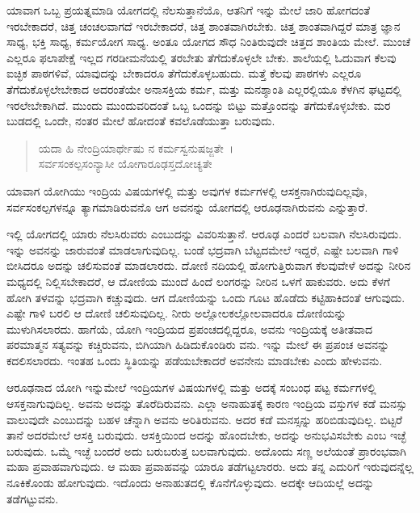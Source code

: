 ಯಾವಾಗ ಒಬ್ಬ ಪ್ರಯತ್ನಮಾಡಿ ಯೋಗದಲ್ಲಿ ನೆಲಸುತ್ತಾನೆಯೊ, ಆತನಿಗೆ ಇನ್ನು ಮೇಲೆ ಜಾರಿ ಹೋಗದಂತೆ ಇರಬೇಕಾದರೆ, ಚಿತ್ತ ಚಂಚಲವಾಗದೆ ಇರಬೇಕಾದರೆ, ಚಿತ್ತ ಶಾಂತವಾಗಿರಬೇಕು. ಚಿತ್ತ ಶಾಂತವಾಗಿದ್ದರೆ ಮಾತ್ರ ಜ್ಞಾನ ಸಾಧ್ಯ, ಭಕ್ತಿ ಸಾಧ್ಯ, ಕರ್ಮಯೋಗ ಸಾಧ್ಯ. ಅಂತೂ ಯೋಗದ ಸೌಧ ನಿಂತಿರುವುದೇ ಚಿತ್ತದ ಶಾಂತಿಯ ಮೇಲೆ. ಮುಂಚೆ ಎಲ್ಲರೂ ಫಲಾಪೇಕ್ಷೆ ಇಲ್ಲದ ಗರಡೀಮನೆಯಲ್ಲಿ ತರಬೇತು ತೆಗೆದುಕೊಳ್ಳಲೇ ಬೇಕು. ಶಾಲೆಯಲ್ಲಿ ಓದುವಾಗ ಕೆಲವು ಐಚ್ಛಿಕ ಪಾಠಗಳಿವೆ, ಯಾವುದನ್ನು ಬೇಕಾದರೂ ತೆಗೆದುಕೊಳ್ಳಬಹುದು. ಮತ್ತೆ ಕೆಲವು ಪಾಠಗಳು ಎಲ್ಲರೂ ತೆಗೆದುಕೊಳ್ಳಲೇಬೇಕಾದ ಅದರಂತೆಯೇ ಅನಾಸಕ್ತಿಯ ಕರ್ಮ, ಮತ್ತು ಮನಶ್ಶಾಂತಿ ಎಲ್ಲರಲ್ಲಿಯೂ ಕೆಳಗಿನ ಘಟ್ಟದಲ್ಲಿ ಇರಲೇಬೇಕಾಗಿದೆ. ಮುಂದು ಮುಂದುವರಿದಂತೆ ಒಬ್ಬ ಒಂದನ್ನು ಬಿಟ್ಟು ಮತ್ತೊಂದನ್ನು ತಗೆದುಕೊಳ್ಳಬೇಕು. ಮರ ಬುಡದಲ್ಲಿ ಒಂದೇ, ನಂತರ ಮೇಲೆ ಹೋದಂತೆ ಕವಲೊಡೆಯುತ್ತಾ ಬರುವುದು.

\begin{verse}
ಯದಾ ಹಿ ನೇಂದ್ರಿಯಾರ್ಥೇಷು ನ ಕರ್ಮಸ್ವನುಷಜ್ಜತೇ~।\\ಸರ್ವಸಂಕಲ್ಪಸಂನ್ಯಾಸೀ ಯೋಗಾರೂಢಸ್ತದೋಚ್ಯತೇ 
\end{verse}

{\small ಯಾವಾಗ ಯೋಗಿಯು ಇಂದ್ರಿಯ ವಿಷಯಗಳಲ್ಲಿ ಮತ್ತು ಅವುಗಳ ಕರ್ಮಗಳಲ್ಲಿ ಆಸಕ್ತನಾಗಿರುವುದಿಲ್ಲವೊ, ಸರ್ವಸಂಕಲ್ಪಗಳನ್ನೂ ತ್ಯಾಗಮಾಡಿರುವನೊ ಆಗ ಅವನನ್ನು ಯೋಗದಲ್ಲಿ ಆರೂಢನಾಗಿರುವನು ಎನ್ನುತ್ತಾರೆ.}

ಇಲ್ಲಿ ಯೋಗದಲ್ಲಿ ಯಾರು ನೆಲಸಿರುವರು ಎಂಬುದನ್ನು ವಿವರಿಸುತ್ತಾನೆ. ಆರೂಢ ಎಂದರೆ ಬಲವಾಗಿ ನೆಲಸಿರುವುದು. ಇನ್ನು ಅವನನ್ನು ಜಾರುವಂತೆ ಮಾಡಲಾಗುವುದಿಲ್ಲ. ಬಂಡೆ ಭದ್ರವಾಗಿ ಬೆಟ್ಟದಮೇಲೆ ಇದ್ದರೆ, ಎಷ್ಟೇ ಬಲವಾಗಿ ಗಾಳಿ ಬೀಸಿದರೂ ಅದನ್ನು ಚಲಿಸುವಂತೆ ಮಾಡಲಾರದು. ದೋಣಿ ನದಿಯಲ್ಲಿ ಹೋಗುತ್ತಿರುವಾಗ ಕೆಲವುವೇಳೆ ಅದನ್ನು ನೀರಿನ ಮಧ್ಯದಲ್ಲಿ ನಿಲ್ಲಿಸಬೇಕಾದರೆ, ಆ ದೋಣಿಯ ಮುಂದೆ ಹಿಂದೆ ಲಂಗರನ್ನು ನೀರಿನ ಒಳಗೆ ಹಾಕುವರು. ಅದು ಕೆಳಗೆ ಹೋಗಿ ತಳವನ್ನು ಭದ್ರವಾಗಿ ಕಚ್ಚುವುದು. ಆಗ ದೋಣಿಯನ್ನು ಒಂದು ಗೂಟ ಹೊಡೆದು ಕಟ್ಟಿಹಾಕಿದಂತೆ ಆಗುವುದು. ಎಷ್ಟೇ ಗಾಳಿ ಬರಲಿ ಆ ದೋಣಿ ಚಲಿಸುವುದಿಲ್ಲ. ನೀರು ಅಲ್ಲೋಲಕಲ್ಲೋಲವಾದರೂ ದೋಣಿಯನ್ನು ಮುಳುಗಿಸಲಾರದು. ಹಾಗೆಯೆ, ಯೋಗಿ ಇಂದ್ರಿಯದ ಪ್ರಪಂಚದಲ್ಲಿದ್ದರೂ, ಅವನು ಇಂದ್ರಿಯಕ್ಕೆ ಅತೀತವಾದ ಪರಮಾತ್ಮನ ಸತ್ಯವನ್ನು ಕಚ್ಚಿರುವನು, ಬಿಗಿಯಾಗಿ ಹಿಡಿದುಕೊಂಡಿರು ವನು. ಇನ್ನು ಮೇಲೆ ಈ ಪ್ರಪಂಚ ಅವನನ್ನು ಕದಲಿಸಲಾರದು. ಇಂತಹ ಒಂದು ಸ್ಥಿತಿಯನ್ನು ಪಡೆಯಬೇಕಾದರೆ ಅವನೇನು ಮಾಡಬೇಕು ಎಂದು ಹೇಳುವನು.

ಆರೂಢನಾದ ಯೋಗಿ ಇನ್ನುಮೇಲೆ ಇಂದ್ರಿಯಗಳ ವಿಷಯಗಳಲ್ಲಿ ಮತ್ತು ಅದಕ್ಕೆ ಸಂಬಂಧ ಪಟ್ಟ ಕರ್ಮಗಳಲ್ಲಿ ಆಸಕ್ತನಾಗುವುದಿಲ್ಲ. ಅವನು ಅದನ್ನು ತೊರೆದಿರುವನು. ಎಲ್ಲಾ ಅನಾಹುತಕ್ಕೆ ಕಾರಣ ಇಂದ್ರಿಯ ವಸ್ತುಗಳ ಕಡೆ ಮನಸ್ಸು ವಾಲುವುದೇ ಎಂಬುದನ್ನು ಬಹಳ ಚೆನ್ನಾಗಿ ಅವನು ಅರಿತಿರುವನು. ಅದರ ಕಡೆ ಮನಸ್ಸನ್ನು ಹರಿಬಿಡುವುದಿಲ್ಲ. ಬಿಟ್ಟರೆ ತಾನೆ ಅದರಮೇಲೆ ಆಸಕ್ತಿ ಬರುವುದು. ಆಸಕ್ತಿಯಿಂದ ಅದನ್ನು ಹೊಂದಬೇಕು, ಅದನ್ನು ಅನುಭವಿಸಬೇಕು ಎಂಬ ಇಚ್ಛೆ ಬರುವುದು. ಒಮ್ಮೆ ಇಚ್ಛೆ ಬಂದರೆ ಅದು ಬರುಬರುತ್ತ ಬಲವಾಗುವುದು. ಅದೊಂದು ಸಣ್ಣ ಅಲೆಯಂತೆ ಪ್ರಾರಂಭವಾಗಿ ಮಹಾ ಪ್ರವಾಹವಾಗುವುದು. ಆ ಮಹಾ ಪ್ರವಾಹವನ್ನು ಯಾರೂ ತಡೆಗಟ್ಟಲಾರರು. ಅದು ತನ್ನ ಎದುರಿಗೆ ಇರುವುದನ್ನೆಲ್ಲ ನೂಕಿಕೊಂಡು ಹೋಗುವುದು. ಇದೊಂದು ಅನಾಹುತದಲ್ಲಿ ಕೊನೆಗೊಳ್ಳುವುದು. ಅದಕ್ಕೇ ಆದಿಯಲ್ಲೆ ಅದನ್ನು ತಡೆಗಟ್ಟುವನು.

